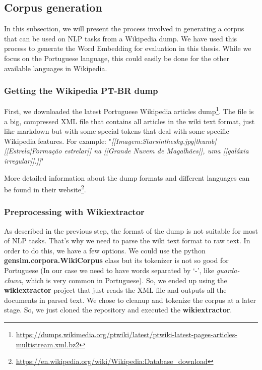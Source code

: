 \subsection{Corpus generation}\label{chap:methodsandmaterials:corpus}

In this subsection, we will present the process involved in generating a corpus that can be used on NLP tasks from a Wikipedia dump. We have used this process to generate the Word Embedding for evaluation in this thesis. While we focus on the Portuguese language, this could easily be done for the other available languages in Wikipedia.

\subsubsection{Getting the Wikipedia PT-BR dump}

First, we downloaded the latest Portuguese Wikipedia articles dump\footnote{\url{https://dumps.wikimedia.org/ptwiki/latest/ptwiki-latest-pages-articles-multistream.xml.bz2}}. The file is a big, compressed XML file that contains all articles in the wiki text format, just like markdown but with some special tokens that deal with some specific Wikipedia features. For example: "\textit{[[Imagem:Starsinthesky.jpg|thumb|[[Estrela|Formação estrelar]] na [[Grande Nuvem de Magalhães]], uma [[galáxia irregular]].]]}"

More detailed information about the dump formats and different languages can be found in their website\footnote{\url{https://en.wikipedia.org/wiki/Wikipedia:Database_download}}.

\subsubsection{Preprocessing with Wikiextractor}

As described in the previous step, the format of the dump is not suitable for most of NLP tasks. That’s why we need to parse the wiki text format to raw text. In order to do this, we have a few options. We could use the python \textbf{gensim.corpora.WikiCorpus} class but its tokenizer is not so good for Portuguese (In our case we need to have words separated by ‘-’, like \textit{guarda-chuva}, which is very common in Portuguese). So, we ended up using the \textbf{wikiextractor} project that just reads the XML file and outputs all the documents in parsed text. We chose to cleanup and tokenize the corpus at a later stage. So, we just cloned the repository and executed the \textbf{wikiextractor}.

